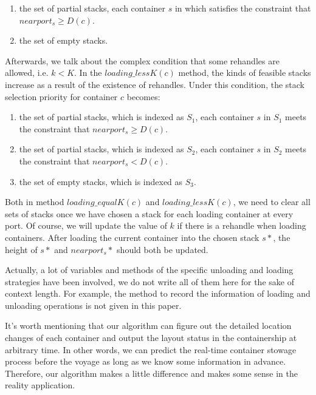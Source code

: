 \documentclass[review,3p,times,authoryear,12pt]{elsarticle}
\begin{document}
\begin{enumerate}
\item the set of partial stacks, each container $s$ in which satisfies the constraint that $nearport_s \ge D(c)$.
\item the set of empty stacks.
\end{enumerate}


Afterwards, we talk about the complex condition that some rehandles are allowed, i.e. $k < K$.
In the $loading\_lessK(c)$ method, the kinds of feasible stacks increase as a result of the existence of rehandles.
Under this condition, the stack selection priority for container $c$ becomes:

\begin{enumerate}
\item the set of partial stacks, which is indexed as $S_1$, each container $s$ in $S_1$ meets the constraint that $nearport_s \ge D(c)$.
\item the set of partial stacks, which is indexed as $S_2$, each container $s$ in $S_2$ meets the constraint that $nearport_s < D(c)$.
\item the set of empty stacks, which is indexed as $S_3$.
\end{enumerate}

Both in method $loading\_equalK(c)$ and $loading\_lessK(c)$, we need to clear all sets of stacks once we have chosen a stack for each loading container at every port.
Of course, we will update the value of $k$ if there is a rehandle when loading containers.
After loading the current container into the chosen stack $s*$, the height of $s*$ and $nearport_s*$ should both be updated.

Actually, a lot of variables and methods of the specific unloading and loading strategies have been involved, we do not write all of them here for the sake of context length.
For example, the method to record the information of loading and unloading operations is not given in this paper.

It's worth mentioning that our algorithm can figure out the detailed location changes of each container and output the layout status in the containership at arbitrary time.
In other words, we can predict the real-time container stowage process before the voyage as long as we know some information in advance.
Therefore, our algorithm makes a little difference and makes some sense in the reality application.
\end{document}
